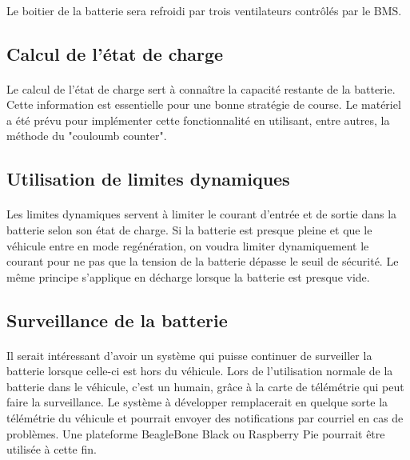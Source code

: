 		\paragraph{}
		Le boitier de la batterie sera refroidi par trois ventilateurs contrôlés par le BMS.

	\subsection{Calcul de l’état de charge}

		\paragraph{}
		Le calcul de l'état de charge sert à connaître la capacité restante de la batterie. Cette information est essentielle pour une bonne stratégie de course. Le matériel a été prévu pour implémenter cette fonctionnalité en utilisant, entre autres, la méthode du "couloumb counter".

	\subsection{Utilisation de limites dynamiques}

		\paragraph{}
		Les limites dynamiques servent à limiter le courant d'entrée et de sortie dans la batterie selon son état de charge. Si la batterie est presque pleine et que le véhicule entre en mode regénération, on voudra limiter dynamiquement le courant pour ne pas que la tension de la batterie dépasse le seuil de sécurité. Le même principe s'applique en décharge lorsque la batterie est presque vide. 

	\subsection{Surveillance de la batterie}

		\paragraph{}
		Il serait intéressant d'avoir un système qui puisse continuer de surveiller la batterie lorsque celle-ci est hors du véhicule. Lors de l'utilisation normale de la batterie dans le véhicule, c'est un humain, grâce à la carte de télémétrie qui peut faire la surveillance. Le système à développer remplacerait en quelque sorte la télémétrie du véhicule et pourrait envoyer des notifications par courriel en cas de problèmes. Une plateforme BeagleBone Black ou Raspberry Pie pourrait être utilisée à cette fin.



